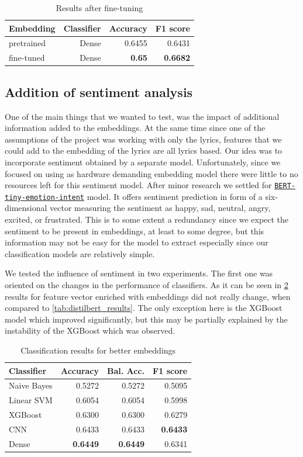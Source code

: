 \begin{table}[h]
\centering
\begin{tabular}{l|r|r|r}
 \textbf{Embedding} & \textbf{Classifier} & \textbf{Accuracy} & \textbf{F1 score} \\\hline
pretrained & Dense & 0.6455 & 0.6431 \\
fine-tuned & Dense & \textbf{0.65} & \textbf{0.6682} \\
\end{tabular}
\caption{Results after fine-tuning}
\label{tab:tuning_results}
\end{table}

\subsection{Addition of sentiment analysis}
One of the main things that we wanted to test, was the impact of additional information added to the embeddings. At the same time since one of the assumptions of the project was working with only the lyrics, features that we could add to the embedding of the lyrics are all lyrics based. Our idea was to incorporate sentiment obtained by a separate model. Unfortunately, since we focused on using as hardware demanding embedding model there were little to no resources left for this sentiment model. After minor research we settled for \href{https://huggingface.co/gokuls/BERT-tiny-emotion-intent}{\texttt{BERT-tiny-emotion-intent}} model. It offers sentiment prediction in form of a six-dimensional vector measuring the sentiment as happy, sad, neutral, angry, excited, or frustrated. This is to some extent a redundancy since we expect the sentiment to be present in embeddings, at least to some degree, but this information may not be easy for the model to extract especially since our classification models are relatively simple.

We tested the influence of sentiment in two experiments. The first one was oriented on the changes in the performance of classifiers. As it can be seen in \ref{tab:sentiment_results} results for feature vector enriched with embeddings did not really change, when compared to \ref{tab:distilbert_results}. The only exception here is the XGBoost model which improved significantly, but this may be partially explained by the instability of the XGBoost which was observed. 

\begin{table}[h]
\centering
\begin{tabular}{l|r|r|r}
 \textbf{Classifier} & \textbf{Accuracy} & \textbf{Bal. Acc.} & \textbf{F1 score} \\\hline
Naive Bayes & 0.5272 & 0.5272 & 0.5095 \\
Linear SVM & 0.6054 & 0.6054 & 0.5998 \\
XGBoost & 0.6300 & 0.6300 & 0.6279 \\
CNN & 0.6433 & 0.6433 & \textbf{0.6433} \\
Dense & \textbf{0.6449} & \textbf{0.6449} & 0.6341 \\
\end{tabular}
\caption{Classification results for better embeddings }
\label{tab:sentiment_results}
\end{table}

